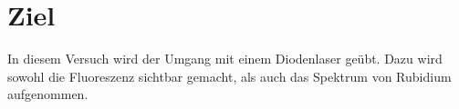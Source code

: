 \section{Ziel}
\label{sec:Ziel}

In diesem Versuch wird der Umgang mit einem Diodenlaser geübt. Dazu wird sowohl die Fluoreszenz sichtbar gemacht, 
als auch das Spektrum von Rubidium aufgenommen.